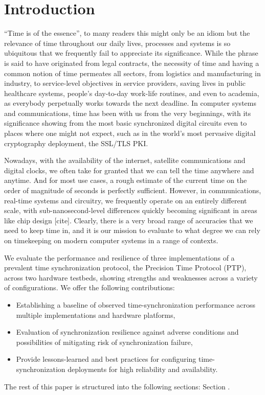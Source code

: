 
\section{Introduction}

``Time is of the essence'', to many readers this might only be an idiom but the relevance of time throughout our daily lives, processes and systems is so ubiquitous that we frequently fail to appreciate its significance. While the phrase is said to have originated from legal contracts, the necessity of time and having a common notion of time permeates all sectors, from logistics and manufacturing in industry, to service-level objectives in service providers, saving lives in public healthcare systems, people's day-to-day work-life routines, and even to academia, as everybody perpetually works towards the next deadline. In computer systems and communications, time has been with us from the very beginnings, with its significance showing from the most basic synchronized digital circuits even to places where one might not expect, such as in the world's most pervasive digital cryptography deployment, the SSL/TLS PKI.

Nowadays, with the availability of the internet, satellite communications and digital clocks, we often take for granted that we can tell the time anywhere and anytime. And for most use cases, a rough estimate of the current time on the order of magnitude of seconds is perfectly sufficient.
However, in communications, real-time systems and circuitry, we frequently operate on an entirely different scale, with sub-nanosecond-level differences quickly becoming significant in areas like chip design [cite]. Clearly, there is a very broad range of accuracies that we need to keep time in, and it is our mission to evaluate to what degree we can rely on timekeeping on modern computer systems in a range of contexts.

We evaluate the performance and resilience of three implementations of a prevalent time synchronization protocol, the Precision Time Protocol (PTP), across two hardware testbeds, showing strengths and weaknesses across a variety of configurations. We offer the following contributions:

\begin{itemize}
    \item Establishing a baseline of observed time-synchronization performance across multiple implementations and hardware platforms,
    \item Evaluation of synchronization resilience against adverse conditions and possibilities of mitigating risk of synchronization failure,
    \item Provide lessons-learned and best practices for configuring time-synchronization deployments for high reliability and availability.
\end{itemize}

The rest of this paper is structured into the following sections: Section .